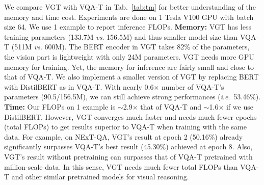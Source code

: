 \documentclass[runningheads]{llncs}
\newcommand{\ie}{\textit{i}.\textit{e}.}
\newcommand{\vs}{\textit{vs}. }
\begin{document}
We compare VGT with VQA-T \cite{yang2021just} in Tab.~\ref{tab:tm} for better understanding of the memory and time cost. Experiments are done on 1 Tesla V100 GPU with batch size 64. We use 1 example to report inference FLOPs.
\textbf{{Memory:}} VGT has less training parameters (133.7M \vs 156.5M) and thus smaller model size than VQA-T (511M \vs 600M). The BERT encoder in VGT takes 82\% of the parameters, the vision part is lightweight with only 24M parameters. VGT needs more GPU memory for training. Yet, the memory for inference are fairly small and close to that of VQA-T. We also implement a smaller version of VGT by replacing BERT with DistilBERT \cite{sanh2019distilbert} as in VQA-T. With nearly 0.6$\times$ number of VQA-T's parameters (90.5/156.5M), we can still achieve strong performances (\ie~53.46\%).
\textbf{{Time:}} Our FLOPs on 1 example is $\sim$2.9$\times$ that of VQA-T and $\sim$1.6$\times$ if we use DistilBERT. However, VGT converges much faster and needs much fewer epochs (total FLOPs) to get results superior to VQA-T when training with the same data. For example, on NExT-QA, VGT's result at epoch 2 (50.16\%) already significantly surpasses VQA-T's best result (45.30\%) achieved at epoch 8. Also, VGT's result without pretraining can surpasses that of VQA-T pretrained with million-scale data. In this sense, VGT needs much fewer total FLOPs than VQA-T and other similar pretrained models for visual reasoning.  
\end{document}
